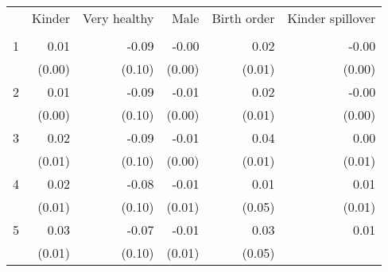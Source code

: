 \begin{tabular}{llllll}
\cline{1-6}
\multicolumn{1}{c}{} &
  \multicolumn{1}{|r}{Kinder} &
  \multicolumn{1}{r}{Very healthy} &
  \multicolumn{1}{r}{Male} &
  \multicolumn{1}{r}{Birth order} &
  \multicolumn{1}{r}{Kinder spillover} \\
\multicolumn{1}{c}{} &
  \multicolumn{1}{|r}{} &
  \multicolumn{1}{r}{} &
  \multicolumn{1}{r}{} &
  \multicolumn{1}{r}{} &
  \multicolumn{1}{r}{} \\
\cline{1-6}
\multicolumn{1}{l}{1} &
  \multicolumn{1}{|r}{0.01} &
  \multicolumn{1}{r}{-0.09} &
  \multicolumn{1}{r}{-0.00} &
  \multicolumn{1}{r}{0.02} &
  \multicolumn{1}{r}{-0.00} \\
\multicolumn{1}{l}{} &
  \multicolumn{1}{|r}{(0.00)} &
  \multicolumn{1}{r}{(0.10)} &
  \multicolumn{1}{r}{(0.00)} &
  \multicolumn{1}{r}{(0.01)} &
  \multicolumn{1}{r}{(0.00)} \\
\multicolumn{1}{l}{2} &
  \multicolumn{1}{|r}{0.01} &
  \multicolumn{1}{r}{-0.09} &
  \multicolumn{1}{r}{-0.01} &
  \multicolumn{1}{r}{0.02} &
  \multicolumn{1}{r}{-0.00} \\
\multicolumn{1}{l}{} &
  \multicolumn{1}{|r}{(0.00)} &
  \multicolumn{1}{r}{(0.10)} &
  \multicolumn{1}{r}{(0.00)} &
  \multicolumn{1}{r}{(0.01)} &
  \multicolumn{1}{r}{(0.00)} \\
\multicolumn{1}{l}{3} &
  \multicolumn{1}{|r}{0.02} &
  \multicolumn{1}{r}{-0.09} &
  \multicolumn{1}{r}{-0.01} &
  \multicolumn{1}{r}{0.04} &
  \multicolumn{1}{r}{0.00} \\
\multicolumn{1}{l}{} &
  \multicolumn{1}{|r}{(0.01)} &
  \multicolumn{1}{r}{(0.10)} &
  \multicolumn{1}{r}{(0.00)} &
  \multicolumn{1}{r}{(0.01)} &
  \multicolumn{1}{r}{(0.01)} \\
\multicolumn{1}{l}{4} &
  \multicolumn{1}{|r}{0.02} &
  \multicolumn{1}{r}{-0.08} &
  \multicolumn{1}{r}{-0.01} &
  \multicolumn{1}{r}{0.01} &
  \multicolumn{1}{r}{0.01} \\
\multicolumn{1}{l}{} &
  \multicolumn{1}{|r}{(0.01)} &
  \multicolumn{1}{r}{(0.10)} &
  \multicolumn{1}{r}{(0.01)} &
  \multicolumn{1}{r}{(0.05)} &
  \multicolumn{1}{r}{(0.01)} \\
\multicolumn{1}{l}{5} &
  \multicolumn{1}{|r}{0.03} &
  \multicolumn{1}{r}{-0.07} &
  \multicolumn{1}{r}{-0.01} &
  \multicolumn{1}{r}{0.03} &
  \multicolumn{1}{r}{0.01} \\
\multicolumn{1}{l}{} &
  \multicolumn{1}{|r}{(0.01)} &
  \multicolumn{1}{r}{(0.10)} &
  \multicolumn{1}{r}{(0.01)} &
  \multicolumn{1}{r}{(0.05)} &

\end{tabular}
